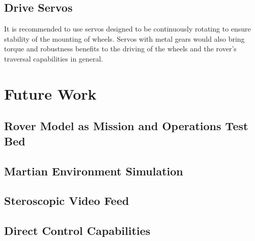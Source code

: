     \subsection{Drive Servos}
      It is recommended to use servos designed to be continuously rotating to ensure stability of the mounting of wheels. Servos with metal gears would also bring torque and robustness benefits to the driving of the wheels and the rover's traversal capabilities in general.
      
  \section{Future Work}
    \subsection{Rover Model as Mission and Operations Test Bed}
    \subsection{Martian Environment Simulation}
    \label{subsec:fut-martianEnvironmentSimulation}
    \subsection{Steroscopic Video Feed}
    \subsection{Direct Control Capabilities}